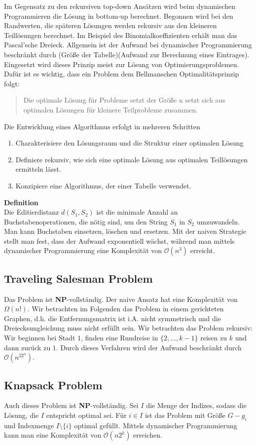 \documentclass[a4paper, 12pt]{article}
\begin{document}
	Im Gegensatz zu den rekursiven top-down Ansätzen wird beim dynamischen Programmieren die Lösung in bottom-up berechnet. Begonnen wird bei den Randwerten, die späteren Lösungen werden rekursiv aus den kleineren Teillösungen berechnet. Im Beispiel des Binomialkoeffizienten erhält man das Pascal'sche Dreieck. Allgemein ist der Aufwand bei dynamischer Programmierung beschränkt durch (Größe der Tabelle)(Aufwand zur Berechnung eines Eintrages). Eingesetzt wird dieses Prinzip meist zur Lösung von Optimierungsproblemen. Dafür ist es wichtig, dass ein Problem dem Bellmanschen Optimalitätsprinzip folgt: \begin{quote}
		Die optimale Lösung für Probleme setzt der Größe n setzt sich aus optimalen Lösungen für kleinere Teilprobleme zusammen.
	\end{quote}
	Die Entwicklung eines Algorithmus erfolgt in mehreren Schritten \begin{enumerate}
		\item Charakterisiere den Lösungsraum und die Struktur einer optimalen Lösung
		\item Definiere rekursiv, wie sich eine optimale Lösung aus optimalen Teillösungen ermitteln lässt.
		\item Konzipiere eine Algorithmus, der einer Tabelle verwendet.
	\end{enumerate}
	\textbf{Definition}\\
	Die Editierdistanz $d(S_1, S_2)$ ist die minimale Anzahl an Buchstabenoperationen, die nötig sind, um den String $S_1$ in $S_2$ umzuwandeln. Man kann Buchstaben einsetzen, löschen und ersetzen. Mit der naiven Strategie stellt man fest, dass der Aufwand exponentiell wächst, während man mittels dynamischer Programmierung eine Komplexität von $\mathcal{O}(n^3)$ erreicht.\\
	\subsection{Traveling Salesman Problem}
	Das Problem ist \textbf{NP}-vollständig. Der naive Ansatz hat eine Komplexität von $\Omega(n!)$. Wir betrachten im Folgenden das Problem in einem gerichteten Graphen, d.h. die Entfernungsmatrix ist i.A. nicht symmetrisch und die Dreiecksungleichung muss nicht erfüllt sein. Wir betrachten das Problem rekursiv: Wir beginnen bei Stadt $1$, finden eine Rundreise in $\{2,...,k-1\}$ reisen zu $k$ und dann zurück zu $1$. Durch dieses Verfahren wird der Aufwand beschränkt durch $\mathcal{O}(n^22^n)$.
	\subsection{Knapsack Problem}
	Auch dieses Problem ist \textbf{NP}-vollständig. Sei $I$ die Menge der Indizes, sodass die Lösung, die $I$ entspricht optimal sei. Für $i \in I$ ist das Problem mit Größe $G-g_i$ und Indexmenge $I\setminus\{i\}$ optimal gefüllt. Mittels dynamischer Programmierung kann man eine Komplexität von $\mathcal{O}(n2^k)$ erreichen.
\end{document}
